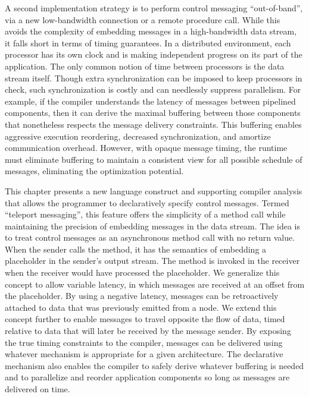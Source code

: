 A second implementation strategy is to perform control messaging
``out-of-band'', via a new low-bandwidth connection or a remote
procedure call.  While this avoids the complexity of embedding
messages in a high-bandwidth data stream, it falls short in terms of
timing guarantees.  In a distributed environment, each processor has
its own clock and is making independent progress on its part of the
application.  The only common notion of time between processors is the
data stream itself.  Though extra synchronization can be imposed to
keep processors in check, such synchronization is costly and can
needlessly suppress parallelism.  
For example, if the compiler understands the latency of messages
between pipelined components, then it can derive the maximal buffering
between those components that nonetheless respects the message
delivery constraints.  This buffering enables aggressive execution
reordering, decreased synchronization, and amortize communication
overhead.  However, with opaque message timing, the runtime must
eliminate buffering to maintain a consistent view for all possible
schedule of messages, eliminating the optimization potential.

This chapter presents a new language construct and supporting compiler
analysis that allows the programmer to declaratively specify control
messages.  Termed ``teleport messaging'', this feature offers the
simplicity of a method call while maintaining the precision of
embedding messages in the data stream.  The idea is to treat control
messages as an asynchronous method call with no return value.  When
the sender calls the method, it has the semantics of embedding a
placeholder in the sender's output stream.  The method is invoked in
the receiver when the receiver would have processed the placeholder.
We generalize this concept to allow variable latency, in which
messages are received at an offset from the placeholder.  By using a
negative latency, messages can be retroactively attached to data that
was previously emitted from a node.  We extend this concept further to
enable messages to travel opposite the flow of data, timed relative to
data that will later be received by the message sender.  By exposing
the true timing constraints to the compiler, messages can be delivered
using whatever mechanism is appropriate for a given architecture.  The
declarative mechanism also enables the compiler to safely derive
whatever buffering is needed and to parallelize and reorder
application components so long as messages are delivered on time.

